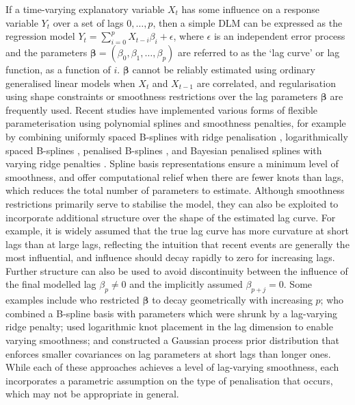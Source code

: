\documentclass[11pt]{article}
\newcommand{\bbeta}{\bm{\beta}}
\begin{document}
If a time-varying explanatory variable $X_t$ has some influence on a response
variable $Y_t$ over a set of lags $0, \ldots, p$, then a simple DLM can be
expressed as the regression model $Y_t = \sum_{i=0}^{p} X_{t-i} \beta_i +
\epsilon$, where $\epsilon$ is an independent error process and the parameters
$\bbeta = (\beta_0, \beta_1, \ldots, \beta_p)$ are referred to as the `lag
curve' or lag function, as a function of $i$. $\bbeta$ cannot be reliably
estimated using ordinary generalised linear models when $X_t$ and $X_{t-1}$ are
correlated, and regularisation using shape constraints or smoothness
restrictions over the lag parameters $\bbeta$ are frequently used. Recent
studies have implemented various forms of flexible parameterisation using
polynomial splines and smoothness penalties, for example by combining uniformly
spaced B-splines with ridge penalisation \citep{zanobetti2000},
logarithmically spaced B-splines \citep{gasparrini2010}, penalised B-splines
\citep{rushworth2013, obermeier2015}, and Bayesian penalised splines with
varying ridge penalties \citep{muggeo2008}. Spline basis representations ensure
a minimum level of smoothness, and offer computational relief when there are
fewer knots than lags, which reduces the total number of parameters to
estimate. Although smoothness restrictions primarily serve to stabilise the
model, they can also be exploited to incorporate additional structure over the
shape of the estimated lag curve. For example, it is widely assumed that the
true lag curve has more curvature at short lags than at large lags, reflecting
the intuition that recent events are generally the most influential, and
influence should decay rapidly to zero for increasing lags. Further structure
can also be used to avoid discontinuity between the influence of the final
modelled lag $\beta_p \neq 0$ and the implicitly assumed $\beta_{p+j} = 0$.
Some examples include \citet{koyck1954} who restricted $\bbeta$ to decay
geometrically with increasing $p$; \citet{muggeo2008} who combined a B-spline
basis with parameters which were shrunk by a lag-varying ridge penalty;
\citet{gasparrini2010} used logarithmic knot placement in the lag dimension to
enable varying smoothness; and \citet{welty2009} constructed a Gaussian process
prior distribution that enforces smaller covariances on lag parameters at short
lags than longer ones. While each of these approaches achieves a level of
lag-varying smoothness, each incorporates a parametric assumption on the type
of penalisation that occurs, which may not be appropriate in general.
\end{document}
